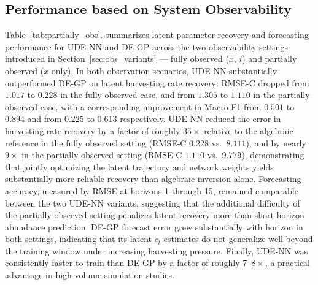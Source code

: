 \documentclass[openacc]{rsproca_new}%
\begin{document}
\subsection{Performance based on System Observability}
Table~\ref{tab:partially_obs}. summarizes latent parameter recovery and forecasting performance for UDE-NN and DE-GP across the two observability settings introduced in  Section~\ref{sec:obs_variants} --- fully observed ($x$, $i$) and partially observed ($x$ only). In both observation scenarios, UDE-NN substantially outperformed DE-GP on latent harvesting rate recovery: RMSE-C dropped from $1.017$ to $0.228$ in the fully observed case, and from $1.305$ to $1.110$ in the partially observed case, with a corresponding improvement in Macro-F1 from $0.501$ to $0.894$ and from $0.225$ to $0.613$ respectively.
UDE-NN reduced the error in harvesting rate recovery by a factor of roughly $35\times$ relative to the algebraic reference in the fully observed setting (RMSE-C $0.228$ vs.\ $8.111$), and by nearly $9\times$ in the partially observed setting (RMSE-C $1.110$ vs.\ $9.779$), demonstrating that jointly optimizing the latent trajectory and network weights yields substantially more reliable recovery than algebraic inversion alone. Forecasting accuracy, measured by RMSE at horizons 1 through 15, remained comparable between the two UDE-NN variants, suggesting that the additional difficulty of the partially observed setting penalizes latent recovery more than short-horizon abundance prediction. DE-GP forecast error grew substantially with horizon in both settings,
indicating that its latent $c_t$ estimates do not generalize well
beyond the training window under increasing harvesting pressure. Finally, UDE-NN was consistently faster to train than DE-GP by a factor of roughly $7$--$8\times$, a practical advantage in high-volume simulation studies.
% 
% 
\end{document}
